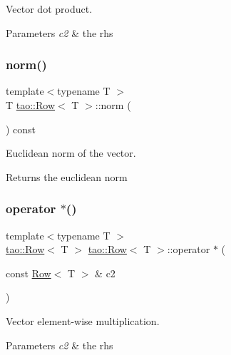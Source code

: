 Vector dot product. 


\begin{DoxyParams}{Parameters}
{\em c2} & the rhs \\
\hline
\end{DoxyParams}
\mbox{\label{classtao_1_1_row_af88f032fa3e9ce20f1d16865cbc95c4f}} 
\subsubsection{\texorpdfstring{norm()}{norm()}}
{\footnotesize\ttfamily template$<$typename T $>$ \\
T \mbox{\hyperlink{classtao_1_1_row}{tao\+::\+Row}}$<$ T $>$\+::norm (\begin{DoxyParamCaption}{ }\end{DoxyParamCaption}) const}



Euclidean norm of the vector. 

\begin{DoxyReturn}{Returns}
the euclidean norm 
\end{DoxyReturn}
\mbox{\label{classtao_1_1_row_a7c588c5d90919377b87192709cda6893}} 
\subsubsection{\texorpdfstring{operator $\ast$()}{operator *()}}
{\footnotesize\ttfamily template$<$typename T $>$ \\
\mbox{\hyperlink{classtao_1_1_row}{tao\+::\+Row}}$<$ T $>$ \mbox{\hyperlink{classtao_1_1_row}{tao\+::\+Row}}$<$ T $>$\+::operator $\ast$ (\begin{DoxyParamCaption}\item[{const \mbox{\hyperlink{classtao_1_1_row}{Row}}$<$ T $>$ \&}]{c2 }\end{DoxyParamCaption})}



Vector element-\/wise multiplication. 


\begin{DoxyParams}{Parameters}
{\em c2} & the rhs \\
\hline
\end{DoxyParams}
\mbox{\label{classtao_1_1_row_a711c598e31ddec8066cff9e43c3bed0b}} 

